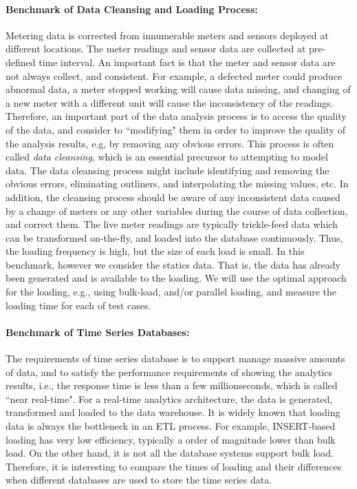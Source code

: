 \documentclass[a4paper,12pt]{llncs}
\newcommand{\ie}{i.e.}
\newcommand{\eg}{e.g.}
\begin{document}
\paragraph{Benchmark of Data Cleansing and Loading Process:} 
Metering data is corrected from innumerable meters and sensors deployed at different locations. The meter readings and  sensor data are collected at pre-defined time interval.  An important fact is that the meter and sensor data are not always collect, and consistent. For example,  a defected meter could produce abnormal data, a meter stopped working will cause data missing, and changing of a new meter with a different unit will cause the  inconsistency of the readings. Therefore, an important part of the data analysis process is to access the quality of the data, and  consider to ``modifying" them in order to improve the quality of the analysis results, e.g, by removing any obvious errors. This process is often called {\em data cleansing}, which is an essential precursor to attempting to model data. The data cleansing process might include identifying and removing the obvious errors, eliminating outliners, and interpolating the missing values, etc. In addition, the cleansing process should be aware of any inconsistent data caused by a change of meters or any other variables during the course of data collection, and correct them. The  live meter readings are typically trickle-feed data which can be transformed on-the-fly, and loaded into the database continuously. Thus, the loading frequency is high, but the size of each load is small. In this benchmark, however we  consider the statics data. That is, the data has already been generated and is available to the loading. We will use the optimal approach for the loading, \eg, using bulk-load, and/or parallel loading, and measure the loading time for each of test cases.

\paragraph{Benchmark of Time Series Databases:}
The requirements of time series database is to support manage massive amounts of data, and to satisfy the performance requirements of showing the analytics results, \ie, the response time is less than a few millionseconds, which is called ``near real-time". For a real-time analytics architecture, the data is generated, transformed and loaded to the data warehouse. It is widely known that loading data is always the bottleneck in an ETL process. For example, INSERT-based loading  has very low efficiency, typically a order of  magnitude lower than bulk load. On the other hand, it is not all the database systems support bulk load. Therefore, it is interesting to compare the times of loading and their differences when different databases are used to store the time series data. 
\end{document}
